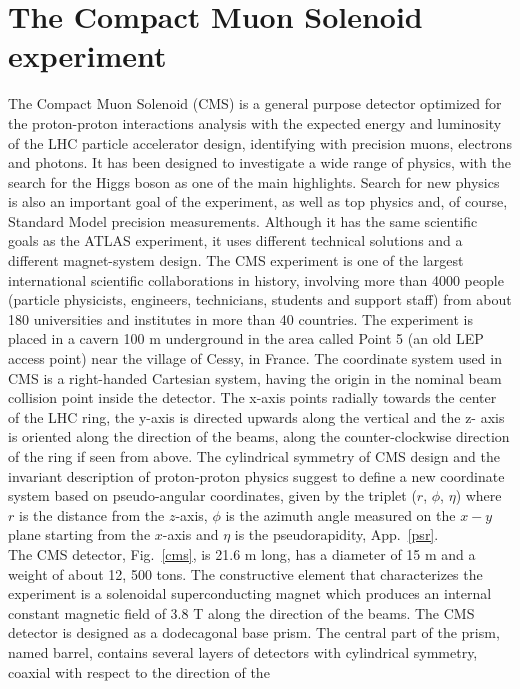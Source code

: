 \section{The Compact Muon Solenoid experiment}
The Compact Muon Solenoid (CMS)  is a general purpose detector optimized for the
proton-proton interactions analysis with the expected energy and luminosity of the LHC
particle accelerator design, identifying with precision muons, electrons and photons. It
has been designed to investigate a wide range of physics, with the search for the Higgs
boson as one of the main highlights. Search for new physics is also an important goal of the
experiment, as well as top physics and, of course, Standard Model precision measurements.
Although it has the same scientific goals as the ATLAS experiment, it uses different
technical solutions and a different magnet-system design. The CMS experiment is one
of the largest international scientific collaborations in history, involving more than 4000
people (particle physicists, engineers, technicians, students and support staff) from about
180 universities and institutes in more than 40 countries.
The experiment is placed in a cavern 100 m underground in the area called Point 5 (an old LEP access point) near the village of Cessy, in France.
The coordinate system used in CMS is a right-handed Cartesian system, having the origin
in the nominal beam collision point inside the detector. The x-axis points radially towards
the center of the LHC ring, the y-axis is directed upwards along the vertical and the z-
axis is oriented along the direction of the beams, along the counter-clockwise direction of
the ring if seen from above. The cylindrical symmetry of CMS design and the invariant
description of proton-proton physics suggest to define a new coordinate system based on
pseudo-angular coordinates, given by the triplet ($r$, $\phi$, $\eta$) where $r$ is the distance from
the $z$-axis, $\phi$ is the azimuth angle measured on the $x-y$ plane starting from the $x$-axis
and $\eta$ is the pseudorapidity, App.~\ref{psr}.\\
\newline
The CMS detector,  Fig.~\ref{cms}, is 21.6 m long, has a diameter of 15 m and a
weight of about 12, 500 tons. The constructive element that characterizes the experiment
is a solenoidal superconducting magnet which produces an internal constant magnetic
field of 3.8 T along the direction of the beams. The CMS detector is designed as a
dodecagonal base prism. The central part of the prism, named barrel, contains several
layers of detectors with cylindrical symmetry, coaxial with respect to the direction of the
